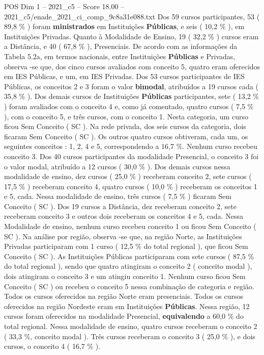 \begin{textsample}{POS Dim 1 – 2021\_c5 – Score 18.00 – 2021\_c5/enade\_2021\_ci\_comp\_9c8a31e088.txt}
Dos 59 cursos participantes, 53 ( 89,8 \% ) foram \textbf{ministrados} em Instituições \textbf{Públicas}, e seis ( 10,2 \% ), em Instituições Privadas.
Quanto à Modalidade de Ensino, 19 ( 32,2 \% ) cursos eram a Distância, e 40 ( 67,8 \% ), Presenciais.
De acordo com as informações da Tabela 5.2a, em termos nacionais, entre Instituições \textbf{Públicas} e Privadas, observa -se que, dos cinco cursos avaliados com conceito 5, quatro eram oferecidos em IES Públicas, e um, em IES Privadas.
Dos 53 cursos participantes de IES Públicas, os conceitos 2 e 3 foram o valor \textbf{bimodal}, atribuídos a 19 cursos cada ( 35,8 \% ).
Dos demais cursos de Instituições \textbf{Públicas} participantes, sete ( 13,2 \% ) foram avaliados com o conceito 4 e, como já comentado, quatro cursos ( 7,5 \% ), com o conceito 5, e três cursos, com o conceito 1.
Nesta categoria, um curso ficou Sem Conceito ( SC ).
Na rede privada, dos seis cursos da categoria, dois ficaram Sem Conceito ( SC ).
Os outros quatro cursos obtiveram, cada um, os seguintes conceitos : 1, 2, 4 e 5, correspondendo a 16,7 \%.
Nenhum curso recebeu conceito 3.
Dos 40 cursos participantes da modalidade Presencial, o conceito 3 foi o valor modal, atribuído a 12 cursos ( 30,0 \% ).
Dos demais cursos nessa modalidade de ensino, dez cursos ( 25,0 \% ) receberam conceito 2, sete cursos ( 17,5 \% ) receberam conceito 4, quatro cursos ( 10,0 \% ) receberam os conceitos 1 e 5, cada.
Nessa modalidade de ensino, três cursos ( 7,5 \% ) ficaram Sem Conceito ( SC ).
Dos 19 cursos a Distância, dez receberam conceito 2, sete receberam conceito 3 e outros dois receberam os conceitos 4 e 5, cada.
Nessa Modalidade de ensino, nenhum curso recebeu conceito 1 ou ficou Sem Conceito ( SC ).
Na análise por região, observa -se que, na região Norte, as Instituições Privadas participaram com 1 curso ( 12,5 \% do total regional ), que ficou Sem Conceito ( SC ).
As Instituições Públicas participaram com sete cursos ( 87,5 \% do total regional ), sendo que quatro atingiram o conceito 2 ( conceito modal ), dois atingiram o conceito 3 e um atingiu conceito 1.
Nenhum curso ficou Sem Conceito ( SC ) ou recebeu o conceito 5 nessa combinação de categoria e região.
Todos os cursos oferecidos na região Norte eram presenciais.
Todos os cursos oferecidos na região Nordeste eram em Instituições \textbf{Públicas}.
Nessa região, 12 cursos foram oferecidos na modalidade Presencial, \textbf{equivalendo} a 60,0 \% do total regional.
Nessa modalidade de ensino, quatro cursos receberam o conceito 2 ( 33,3 \%, conceito modal ).
Três cursos receberam o conceito 3 ( 25,0 \% ), e dois cursos, o conceito 4 ( 16,7 \% ).

\end{textsample}
